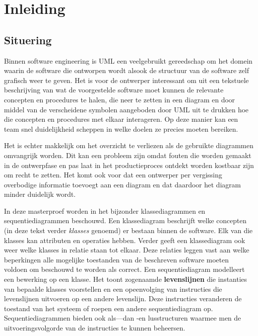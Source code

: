 \chapter{Inleiding}

\section{Situering}\label{sec:situering}

Binnen software engineering is UML\cite{RumbaughJames2005Tuml} een veelgebruikt gereedschap om het domein waarin de software die ontworpen wordt alsook de structuur van de software zelf grafisch weer te geven. Het is voor de ontwerper interessant om uit een tekstuele beschrijving van wat de voorgestelde software moet kunnen de relevante concepten en procedures te halen, die neer te zetten in een diagram en door middel van de verscheidene symbolen aangeboden door UML uit te drukken hoe die concepten en procedures met elkaar interageren. Op deze manier kan een team snel duidelijkheid scheppen in welke doelen ze precies moeten bereiken.

Het is echter makkelijk om het overzicht te verliezen als de gebruikte diagrammen omvangrijk worden. Dit kan een probleem zijn omdat fouten die worden gemaakt in de ontwerpfase en pas laat in het productieproces ontdekt worden kostbaar zijn om recht te zetten. Het komt ook voor dat een ontwerper per vergissing overbodige informatie toevoegt aan een diagram en dat daardoor het diagram minder duidelijk wordt.

In deze masterproef worden in het bijzonder klassediagrammen en sequentiediagrammen beschouwd.
Een klassediagram beschrijft welke concepten (in deze tekst verder \textit{klasses} genoemd) er bestaan binnen de software. Elk van die klasses kan attributen en operaties hebben. Verder geeft een klassediagram ook weer welke klasses in relatie staan tot elkaar. Deze relaties leggen vast aan welke beperkingen alle mogelijke toestanden van de beschreven software moeten voldoen om beschouwd te worden als correct.
Een sequentiediagram modelleert een bewerking op een klasse. Het toont zogenaamde \textbf{levenslijnen} die instanties van bepaalde klasses voorstellen en een opeenvolging van instructies die levenslijnen uitvoeren op een andere levenslijn. Deze instructies veranderen de toestand van het systeem of roepen een andere sequentiediagram op. Sequentiediagrammen bieden ook als---dan -en lusstructuren waarmee men de uitvoeringsvolgorde van de instructies te kunnen beheersen.

